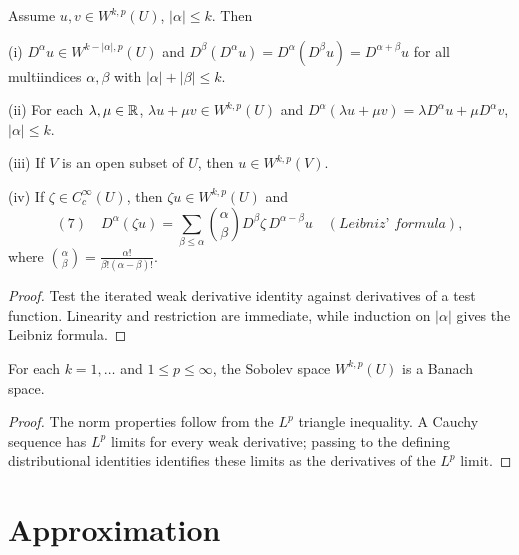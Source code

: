 \begin{theorem}
\label{thm:weak-derivative-properties}

Assume $u, v \in W^{k,p}(U)$, $|\alpha| \le k$. Then

(i) $D^{\alpha}u \in W^{k-|\alpha|,p}(U)$ and $D^{\beta}(D^{\alpha}u) = D^{\alpha}(D^{\beta}u) = D^{\alpha+\beta}u$ for all multiindices $\alpha, \beta$ with $|\alpha| + |\beta| \le k$.

(ii) For each $\lambda, \mu \in \mathbb{R}$, $\lambda u + \mu v \in W^{k,p}(U)$ and $D^{\alpha}(\lambda u + \mu v) = \lambda D^{\alpha}u + \mu D^{\alpha}v$, $|\alpha| \le k$.

(iii) If $V$ is an open subset of $U$, then $u \in W^{k,p}(V)$.

(iv) If $\zeta \in C_c^{\infty}(U)$, then $\zeta u \in W^{k,p}(U)$ and
$$(7) \quad D^{\alpha}(\zeta u) = \sum_{\beta \le \alpha} \binom{\alpha}{\beta} D^{\beta}\zeta\, D^{\alpha-\beta}u \quad (\textit{Leibniz' formula}),$$
where $\binom{\alpha}{\beta} = \frac{\alpha!}{\beta!(\alpha-\beta)!}$.
\end{theorem}

\begin{proof}
\sketch Test the iterated weak derivative identity against derivatives of a test function. Linearity and restriction are immediate, while induction on $|\alpha|$ gives the Leibniz formula.
\end{proof}

\begin{theorem}
\label{thm:sobolev-space-banach}

For each $k = 1, \ldots$ and $1 \le p \le \infty$, the Sobolev space $W^{k,p}(U)$ is a Banach space.
\end{theorem}

\begin{proof}
\sketch The norm properties follow from the $L^p$ triangle inequality. A Cauchy sequence has $L^p$ limits for every weak derivative; passing to the defining distributional identities identifies these limits as the derivatives of the $L^p$ limit.
\end{proof}

\section{Approximation}
\label{sec:sobolev-approximation}

